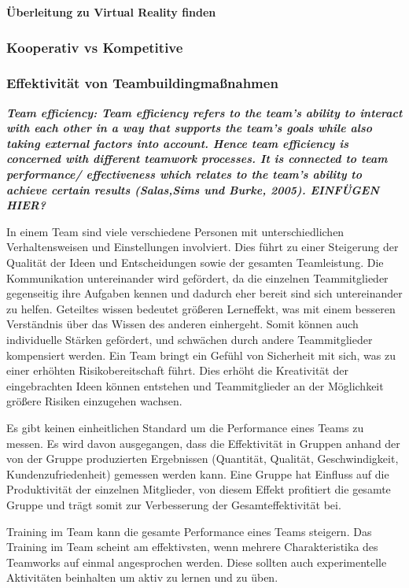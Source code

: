 \documentclass[a4paper,11pt]{article}%
\renewcommand{\\}{\vspace*{0.5\baselineskip} \newline}
\begin{document}
{\textbf{Überleitung zu Virtual Reality finden}


	\subsubsection{Kooperativ vs Kompetitive}
	
		\subsubsection{Effektivität von Teambuildingmaßnahmen}
		
	\textit{\textbf{Team efficiency: Team efficiency refers to the team’s ability to interact with each other in a way that supports the team’s goals while also taking external factors into account. Hence team efficiency is concerned with different teamwork processes. It is connected to team performance/ effectiveness which relates to the team’s ability to achieve certain results (Salas,Sims und Burke, 2005). EINFÜGEN HIER?}}
	
	In einem Team sind viele verschiedene Personen mit unterschiedlichen Verhaltensweisen und Einstellungen involviert. Dies führt zu einer Steigerung der Qualität der Ideen und Entscheidungen sowie der gesamten Teamleistung.
	Die Kommunikation untereinander wird gefördert, da die einzelnen Teammitglieder gegenseitig ihre Aufgaben kennen und dadurch eher bereit sind sich untereinander zu helfen.
	Geteiltes wissen bedeutet größeren Lerneffekt, was mit einem besseren Verständnis über das Wissen des anderen einhergeht. Somit können auch individuelle Stärken gefördert, und schwächen durch andere Teammitglieder kompensiert werden.
	Ein Team bringt ein Gefühl von Sicherheit mit sich, was zu einer erhöhten Risikobereitschaft führt. Dies erhöht die Kreativität der eingebrachten Ideen können entstehen und Teammitglieder an der Möglichkeit größere Risiken einzugehen wachsen. \citep[p. 2-4]{biech2007pfeiffer}
	
	Es gibt keinen einheitlichen Standard um die Performance eines Teams zu messen. Es wird davon ausgegangen, dass die Effektivität in Gruppen anhand der von der Gruppe produzierten Ergebnissen (Quantität, Qualität, Geschwindigkeit, Kundenzufriedenheit) gemessen werden kann. Eine Gruppe hat Einfluss auf die Produktivität der einzelnen Mitglieder, von diesem Effekt profitiert die gesamte Gruppe und trägt somit zur Verbesserung der Gesamteffektivität bei. \citep[p.309]{guzzo1996teams}
	
	Training im Team kann die gesamte Performance eines Teams steigern. Das Training im Team scheint am effektivsten, wenn mehrere Charakteristika des Teamworks auf einmal angesprochen werden. Diese sollten auch experimentelle Aktivitäten beinhalten um aktiv zu lernen und zu üben. \citep[19]{mcewan2017effectiveness}
	
}
\end{document}
